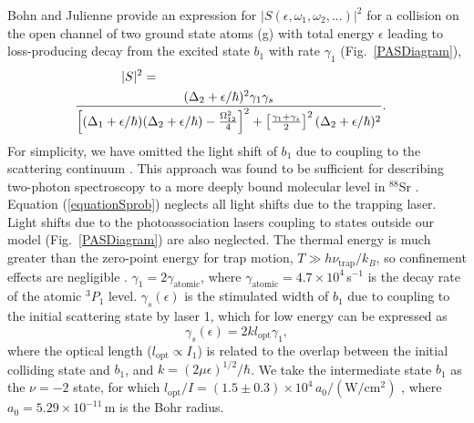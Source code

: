 Bohn and Julienne \cite{bju96} provide an expression for $\vert S(\epsilon,\omega_1,\omega_2,...)\vert^2$ for a collision on the open channel of two ground state atoms (g) with total energy $\epsilon$ leading to loss-producing decay from the excited state $b_1$ with rate $\gamma_1$ (Fig.\ \ref{PASDiagram}),
\begin{eqnarray}\label{equationSprob}
  \vert S\vert^2 =   \hspace{2.5in}&&\\
  {(\Delta_2+\epsilon/\hbar)^2{\gamma}_1{\gamma}_s \over
  	\left[(\Delta_1+\epsilon/\hbar)(\Delta_2+\epsilon/\hbar)-\frac{\Omega_{12}^{2}}{4}\right]^2+\left[ \frac{\gamma_1+\gamma_s}{2}\right]^2(\Delta_2+		 	\epsilon/\hbar)^2}. &&\nonumber
\end{eqnarray}
 For simplicity, we have omitted the light shift of $b_1$ due to coupling to the scattering continuum \cite{bju99}.  This approach was found to be sufficient for describing two-photon spectroscopy to a more deeply bound molecular level in $^{88}$Sr \cite{mmp08}. Equation (\ref{equationSprob}) neglects all light shifts due to the trapping laser. Light shifts due to the photoassociation lasers coupling to states outside our model (Fig.\ \ref{PASDiagram}) are also neglected. The thermal energy is much greater than the zero-point energy for trap motion, $T\gg h\nu_{\text{trap}}/k_B$, so confinement effects are negligible \cite{zbl06}.
${\gamma}_{1}=2\gamma_{\text{atomic}}$, where $\gamma_{\text{atomic}}=4.7\times 10^4$\,s$^{-1}$ is the decay rate of the atomic $^3P_1$ level. ${\gamma}_{s}(\epsilon)$ is the stimulated width of $b_1$ due to coupling to the initial scattering state by laser 1, which for low energy can be expressed as \cite{ctj06,bmc14,pdt17}
\begin{equation}\label{equationstimulatedwidth}
	{\gamma}_{s}(\epsilon)=2k l_{\text{opt}} \gamma_1,
\end{equation}
where the optical length ($l_{\text{opt}}\propto I_1$) is related to the overlap between the initial colliding state and $b_1$, and $k=(2\mu \epsilon)^{1/2}/\hbar$. We take the intermediate state $b_1$ as the $\nu=-2$ state, for which $l_{\text{opt}}/I=(1.5\pm0.3)\times 10^4\,a_0\mathrm{/(W/cm^2)}$ \cite{bmc14}, where $a_0=5.29\times 10^{-11}$\,m is the Bohr radius.


